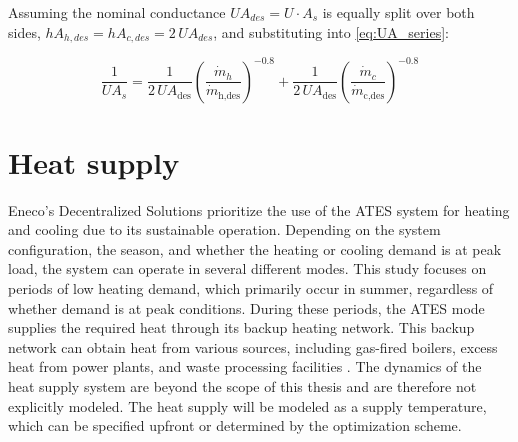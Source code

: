 \noindent Assuming the nominal conductance $UA_{des} = U \cdot A_s$ is equally split over both sides, $hA_{h,des} = hA_{c,des} = 2\,UA_{des}$, and substituting into \eqref{eq:UA_series}:

\begin{equation}
    \frac{1}{UA_s} = 
    \frac{1}{2\,UA_{\text{des}}} \left(\frac{\dot{m}_h}{\dot{m}_{\text{h,des}}}\right)^{-0.8}
    + \frac{1}{2\,UA_{\text{des}}} \left(\frac{\dot{m}_c}{\dot{m}_{\text{c,des}}}\right)^{-0.8}
    \label{eq:UA_offdesign}
\end{equation}




\section{Heat supply}
Eneco's Decentralized Solutions prioritize the use of the ATES system for heating and cooling due to its sustainable operation. Depending on the system configuration, the season, and whether the heating or cooling demand is at peak load, the system can operate in several different modes. This study focuses on periods of low heating demand, which primarily occur in summer, regardless of whether demand is at peak conditions. During these periods, the ATES mode supplies the required heat through its backup heating network. This backup network can obtain heat from various sources, including gas-fired boilers, excess heat from power plants, and waste processing facilities \cite{heatsupply}. The dynamics of the heat supply system are beyond the scope of this thesis and are therefore not explicitly modeled. The heat supply will be modeled as a supply temperature, which can be specified upfront or determined by the optimization scheme. 


